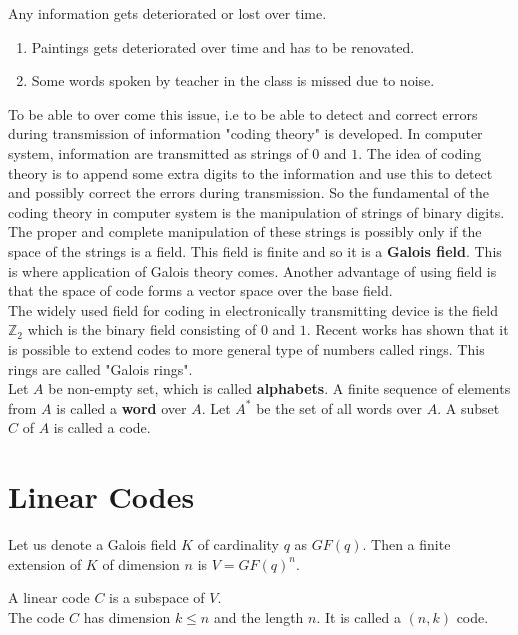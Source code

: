 Any information gets deteriorated or lost over time. 

\begin{enumerate}
\item Paintings gets deteriorated over time and has to be renovated. 
\item Some words spoken by teacher in the class is missed due to noise. 
\end{enumerate}

To be able to over come this issue, i.e to be able to detect and correct errors during transmission of information "coding theory" is developed.
In computer system, information are transmitted as strings of \(0\) and \(1\). The idea of coding theory is to append some extra digits to the information and use this to detect and possibly correct the errors during transmission.
So the fundamental of the coding theory in computer system is the manipulation of strings of binary digits. The proper and complete manipulation of these strings is possibly only if the space of the strings is a field. This field is finite and so it is a \textbf{Galois field}. This is where application of Galois theory comes.
Another advantage of using field is that the space of code forms a vector space over the base field. \\
The widely used field for coding in electronically transmitting device is the field \({\mathbb{Z}}_2\) which is the binary field consisting of \(0\) and \(1\). Recent works has shown that it is possible to extend codes to more general type of numbers called rings. This rings are called "Galois rings".\\

Let \(A\) be non-empty set, which is called \textbf{alphabets}. A finite sequence of elements from \(A\) is called a \textbf{word} over \(A\). Let \(A^*\) be the set of all words over \(A\). A subset \(C\) of \(A\) is called a code.

\section{Linear Codes}
Let us denote a Galois field \(K\) of cardinality \(q\) as \(GF(q)\). Then a finite extension of \(K\) of dimension \(n\) is \(V=GF(q)^n\).
\begin{definition}
    A linear code \(C\) is a subspace of \(V\). \\
    The code \(C\) has dimension \(k \leq n\) and the length \(n\). It is called a \((n,k)\) code.
\end{definition}

